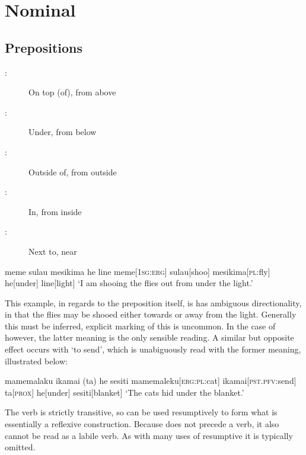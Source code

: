 \chapter{Nominal}

\section{Prepositions}\label{sec:adpositions}

\begin{description}
  \item[:] On top (of), from above
  \item[:] Under, from below
  \item[:] Outside of, from outside
  \item[:] In, from inside
  \item[:] Next to, near
\end{description}

\ex
\begingl
\glpreamble meme sulau mesikima he line
\endpreamble
meme[\textsc{1sg:erg}]
sulau[shoo]
mesikima[\textsc{pl:}fly]
he[under]
line[light]
\glft `I am shooing the flies out from under the light.'
\endgl
\xe

This example, in regards to the preposition itself, is has ambiguous directionality, in that the flies may be shooed either towards or away from the light. Generally this must be inferred, explicit marking of this is uncommon. In the case of  however, the latter meaning is the only sensible reading. A similar but opposite effect occurs with  `to send', which is unabiguously read with the former meaning, illustrated below:

\ex
\begingl
\glpreamble mamemalaku ikamai (ta) he sesiti
\endpreamble
mamemaleku[\textsc{erg:pl:}cat]
ikamai[\textsc{pst.pfv:}send]
ta[\textsc{prox}]
he[under]
sesiti[blanket]
\glft `The cats hid under the blanket.'\footnotemark
\endgl
\xe


The verb  is strictly transitive, so  can be used resumptively to form what is essentially a reflexive construction. Because  does not precede a verb, it also cannot be read as a labile verb. As with many uses of resumptive  it is typically omitted.

